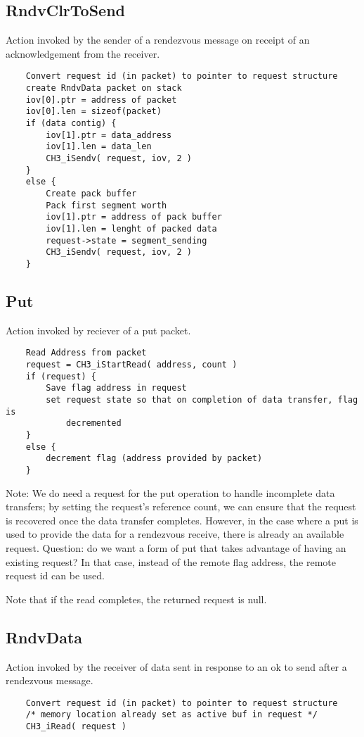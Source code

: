 \documentclass{article}
\begin{document}
\subsection{RndvClrToSend}
Action invoked by the sender of a rendezvous message on receipt of an
acknowledgement from the receiver.
\begin{verbatim}
    Convert request id (in packet) to pointer to request structure
    create RndvData packet on stack
    iov[0].ptr = address of packet
    iov[0].len = sizeof(packet)
    if (data contig) {
        iov[1].ptr = data_address
        iov[1].len = data_len
        CH3_iSendv( request, iov, 2 )
    }
    else {
        Create pack buffer
        Pack first segment worth
        iov[1].ptr = address of pack buffer
        iov[1].len = lenght of packed data
        request->state = segment_sending
        CH3_iSendv( request, iov, 2 )
    }
\end{verbatim}

\subsection{Put}
Action invoked by reciever of a put packet.  
\begin{verbatim}
    Read Address from packet
    request = CH3_iStartRead( address, count )
    if (request) {
        Save flag address in request
        set request state so that on completion of data transfer, flag is
            decremented
    }
    else {
        decrement flag (address provided by packet)
    }
\end{verbatim}
Note: We do need a request for the put operation to handle incomplete
data transfers; by setting the 
request's reference count, we can ensure that the request is recovered once
the data transfer completes.  However, in the case where a put is used to
provide the data for a rendezvous receive, there is already an available
request.  Question: do we want a form of put that takes advantage of having an
existing request?  In that case, instead of the remote flag address, the
remote request id can be used.

Note that if the read completes, the returned request is null.

\subsection{RndvData}
Action invoked by the receiver of data sent in response to an ok to send after
a rendezvous message.
\begin{verbatim}
    Convert request id (in packet) to pointer to request structure
    /* memory location already set as active buf in request */
    CH3_iRead( request )
\end{verbatim}
\end{document}
